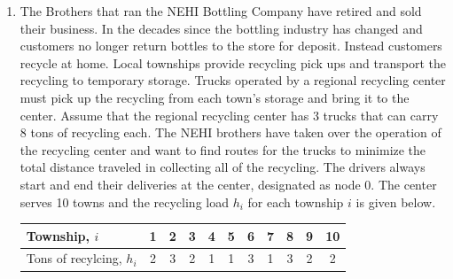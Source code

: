 \documentclass[letterpaper,oneside,12pt]{article}%
\begin{document}
\begin{enumerate}
\begin{enumerate}
{If $y = 1$, the RHS becomes 5 letting you select as many edges as you want. If $y = 0$, the RHS becomes 0 which forces you to only select 2 edges.


}

%
\end{enumerate}





\item The Brothers that ran the NEHI Bottling Company have retired and sold their business. In the decades since the bottling industry has changed and customers no longer return bottles to the store for deposit. Instead customers recycle at home. Local townships provide recycling pick ups and transport the recycling to temporary storage. Trucks operated by a regional recycling center must pick up the recycling from each town's storage and bring it to the center. Assume that the regional recycling center has 3 trucks that can carry 8 tons of recycling each. The NEHI brothers have taken over the operation of the recycling center and want to find routes for the trucks to minimize the total distance traveled in collecting all of the recycling. The drivers always start and end their deliveries at the center, designated as node 0.  The center serves 10 towns and the recycling load $h_i$ for each township $i$ is given below. 

\begin{center}
\begin{tabular}{|l||c|c|c|c|c|c|c|c|c|c|} \hline
Township, $i$
&  1	&	2	&	3	&	4	&     5	&	6	&	7	&	8	&   9    &     10
\\
\hline
Tons of recylcing, $h_i$ 
&   2	&	3	&	2	&	1	&	1	&	3	&	1	&	3	&    2   &   2 \\\hline
\end{tabular}
\end{center}


\end{enumerate}
\end{document}
